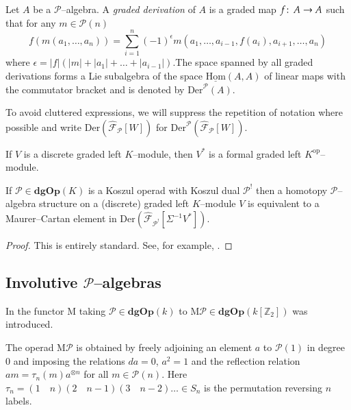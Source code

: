 \documentclass[british]{amsart}
\theoremstyle{plain}
\theoremstyle{definition}
{
\newaliascnt{{definition}}{theorem}\newtheorem{{definition}}[{definition}]{{Definition}}\aliascntresetthe{{definition}}\expandafterautorefname\endcsname{{Definition}}}
{
\newaliascnt{{remark}}{theorem}\newtheorem{{remark}}[{remark}]{{Remark}}\aliascntresetthe{{remark}}\expandafterautorefname\endcsname{{Remark}}}
{
\newaliascnt{{example}}{theorem}\newtheorem{{example}}[{example}]{{Example}}\aliascntresetthe{{example}}\expandafterautorefname\endcsname{{Example}}}
{
\newaliascnt{{examples}}{theorem}\newtheorem{{examples}}[{examples}]{{Examples}}\aliascntresetthe{{examples}}\expandafterautorefname\endcsname{{Examples}}}
{
\newaliascnt{{notation}}{theorem}\newtheorem{{notation}}[{notation}]{{Notation}}\aliascntresetthe{{notation}}\expandafterautorefname\endcsname{{Notation}}}
{
\newaliascnt{{convention}}{theorem}\newtheorem{{convention}}[{convention}]{{Convention}}\aliascntresetthe{{convention}}\expandafterautorefname\endcsname{{Convention}}}
\numberwithin{equation}{section}
\numberwithin{figure}{section}
\begin{document}
\begin{definition}
Let $A$ be a $\mathcal{P}$--algebra. A \emph{graded derivation} of $A$ is a graded map $f{\colon\thinspace} A\rightarrow A$ such that for any $m \in \mathcal{P}(n)$
\[
f(m(a_1, \dots, a_n )) = \sum_{i=1}^n (-1)^{\epsilon} m(a_1, \dots, a_{i-1}, f(a_i), a_{i+1}, \dots, a_n)
\]
where $\epsilon = {\lvert {f} \rvert}({\lvert {m} \rvert}+{\lvert {a_1} \rvert}+\dots+{\lvert {a_{i-1}} \rvert})$.The space spanned by all graded derivations forms a Lie subalgebra of the space $\operatorname{\underline{Hom}}(A,A)$ of linear maps with the commutator bracket and is denoted by ${\mathrm{Der}}^\mathcal{P}(A)$.
\end{definition}

\begin{remark}
To avoid cluttered expressions, we will suppress the repetition of notation where possible and write ${\mathrm{Der}}({\widehat{\mathcal{F}}_{{\mathcal{P}}}[{W}]})$ for ${\mathrm{Der}}^{\mathcal{P}}({\widehat{\mathcal{F}}_{{\mathcal{P}}}[{W}]})$.
\end{remark}

If $V$ is a discrete graded left $K$--module, then $V^*$ is a formal graded left $K^{\mathrm{op}}$--module.

\begin{proposition}\label{prop:homotopyalgisderivation}
If $\mathcal{P}\in{\mathbf{dgOp}}(K)$ is a Koszul operad with Koszul dual $\mathcal{P}^!$ then a homotopy $\mathcal{P}$--algebra structure on a (discrete) graded left $K$--module $V$ is equivalent to a Maurer--Cartan element in ${\mathrm{Der}}({\widehat{\mathcal{F}}_{{\mathcal{P}^!}}[{\Sigma^{-1}V^*}]})$.
\end{proposition}

\begin{proof}
This is entirely standard. See, for example, \cite[Proposition 4.2.14]{ginzburgkapranov1994:koszuloperads}.
\end{proof}

\subsection{Involutive \texorpdfstring{$\mathcal{P}$}{P}--algebras}
In \cite{braun:moduliklein} the functor ${\mathrm{M}}$ taking $\mathcal{P}\in{\mathbf{dgOp}}(k)$ to ${\mathrm{M}}\mathcal{P}\in{\mathbf{dgOp}}(k[\mathbb{Z}_2])$ was introduced.

The operad ${\mathrm{M}}\mathcal{P}$ is obtained by freely adjoining an element $a$ to $\mathcal{P}(1)$ in degree $0$ and imposing the relations $da=0$, $a^2=1$ and the reflection relation $am=\tau_n(m)a^{\otimes n}$ for all $m\in\mathcal{P}(n)$. Here $\tau_n=(1\quad n)(2\quad n-1)(3\quad n-2)\ldots\in S_n$ is the permutation reversing $n$ labels.
\end{document}
